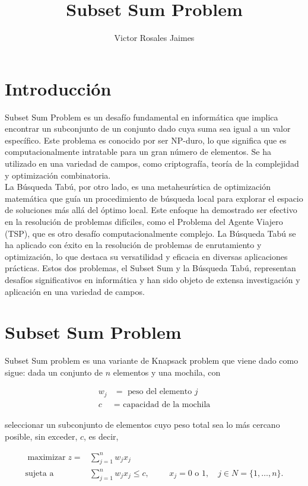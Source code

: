\documentclass[spanish,12pt,letterpaper]{article}
\title{\textbf{Subset Sum Problem}}
\author{Victor Rosales Jaimes}
\date{}
\begin{document}
	\maketitle
	\section{Introducción}
	
	Subset Sum Problem es un desafío fundamental en informática que implica encontrar un subconjunto de un conjunto dado cuya suma sea igual a un valor específico. Este problema es conocido por ser NP-duro, lo que significa que es computacionalmente intratable para un gran número de elementos. Se ha utilizado en una variedad de campos, como criptografía, teoría de la complejidad y optimización combinatoria.\\
	
	
	La Búsqueda Tabú, por otro lado, es una metaheurística de optimización matemática que guía un procedimiento de búsqueda local para explorar el espacio de soluciones más allá del óptimo local. Este enfoque ha demostrado ser efectivo en la resolución de problemas difíciles, como el Problema del Agente Viajero (TSP), que es otro desafío computacionalmente complejo. La Búsqueda Tabú se ha aplicado con éxito en la resolución de problemas de enrutamiento y optimización, lo que destaca su versatilidad y eficacia en diversas aplicaciones prácticas. Estos dos problemas, el Subset Sum y la Búsqueda Tabú, representan desafíos significativos en informática y han sido objeto de extensa investigación y aplicación en una variedad de campos.
	
	\section{Subset Sum Problem}
	
	Subset Sum problem es una variante de Knapsack problem que viene dado como sigue: dada un conjunto de $n$ elementos y una mochila, con
	
	$$
	\begin{aligned}
		w_{j} & =\text{ peso del elemento } j \\
		c & =\text{ capacidad de la mochila}
	\end{aligned}
	$$
	
	seleccionar un subconjunto de elementos cuyo peso total sea lo más cercano posible, sin exceder, $c$, es decir,
	
	
	\begin{align}
		\operatorname{maximizar} z= & \sum_{j=1}^{n} w_{j} x_{j} \\
		\text{sujeta a} & \sum_{j=1}^{n} w_{j} x_{j} \leq c, \hspace{1cm} x_{j}=0 \text{ o } 1, \quad j \in N=\{1, \ldots, n\}.
	\end{align}
	
\end{document}
